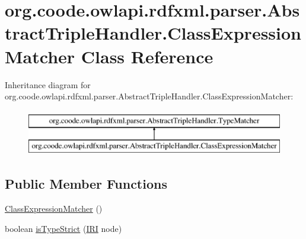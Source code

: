 \hypertarget{classorg_1_1coode_1_1owlapi_1_1rdfxml_1_1parser_1_1_abstract_triple_handler_1_1_class_expression_matcher}{\section{org.\-coode.\-owlapi.\-rdfxml.\-parser.\-Abstract\-Triple\-Handler.\-Class\-Expression\-Matcher Class Reference}
\label{classorg_1_1coode_1_1owlapi_1_1rdfxml_1_1parser_1_1_abstract_triple_handler_1_1_class_expression_matcher}
}
Inheritance diagram for org.\-coode.\-owlapi.\-rdfxml.\-parser.\-Abstract\-Triple\-Handler.\-Class\-Expression\-Matcher\-:\begin{figure}[H]
\begin{center}
\leavevmode
\includegraphics[height=2.000000cm]{classorg_1_1coode_1_1owlapi_1_1rdfxml_1_1parser_1_1_abstract_triple_handler_1_1_class_expression_matcher}
\end{center}
\end{figure}
\subsection*{Public Member Functions}
\begin{DoxyCompactItemize}
\item 
\hyperlink{classorg_1_1coode_1_1owlapi_1_1rdfxml_1_1parser_1_1_abstract_triple_handler_1_1_class_expression_matcher_acabbb582879c1ad42e2bfda81861c9c1}{Class\-Expression\-Matcher} ()
\item 
boolean \hyperlink{classorg_1_1coode_1_1owlapi_1_1rdfxml_1_1parser_1_1_abstract_triple_handler_1_1_class_expression_matcher_adb0827c73671f9dd099dc1da4ca56ba8}{is\-Type\-Strict} (\hyperlink{classorg_1_1semanticweb_1_1owlapi_1_1model_1_1_i_r_i}{I\-R\-I} node)
\end{DoxyCompactItemize}


